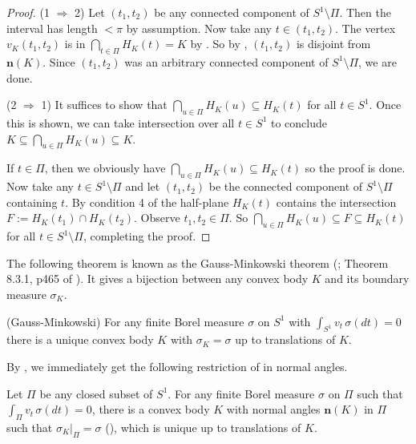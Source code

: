 \begin{proof}
(1 \(\Rightarrow\) 2) Let \((t_1, t_2)\) be any connected component of \(S^1 \setminus \Pi\). Then the interval has length \(< \pi\) by assumption. Now take any \(t \in (t_1, t_2)\). The vertex \(v_K(t_1, t_2)\) is in \(\bigcap_{t \in \Pi} H_K(t) = K\) by . So by , \((t_1, t_2)\) is disjoint from \(\mathbf{n}(K)\). Since \((t_1, t_2)\) was an arbitrary connected component of \(S^1 \setminus \Pi\), we are done.

(2 \(\Rightarrow\) 1) It suffices to show that \(\bigcap_{u \in \Pi} H_K(u) \subseteq H_K(t)\) for all \(t \in S^1\). Once this is shown, we can take intersection over all \(t \in S^1\) to conclude \(K \subseteq \bigcap_{u \in \Pi} H_K(u) \subseteq K\).

If \(t \in \Pi\), then we obviously have \(\bigcap_{u \in \Pi} H_K(u) \subseteq H_K(t)\) so the proof is done. Now take any \(t \in S^1 \setminus \Pi\) and let \((t_1, t_2)\) be the connected component of \(S^1 \setminus \Pi\) containing \(t\). By condition 4 of  the half-plane \(H_K(t)\) contains the intersection \(F := H_K(t_1) \cap H_K(t_2)\). Observe \(t_1, t_2 \in \Pi\). So \(\bigcap_{u \in \Pi} H_K(u) \subseteq F \subseteq H_K(t)\) for all \(t \in S^1 \setminus \Pi\), completing the proof.
\end{proof}

The following theorem is known as the Gauss-Minkowski theorem (\autocite{marckert2014compact}; Theorem 8.3.1, p465 of \cite{schneider_2013}). It gives a bijection between any convex body \(K\) and its boundary measure \(\sigma_K\).

\begin{theorem}

(Gauss-Minkowski) For any finite Borel measure \(\sigma\) on \(S^1\) with \(\int_{S^1} v_t \, \sigma (dt) = 0\) there is a unique convex body \(K\) with \(\sigma_K = \sigma\) up to translations of \(K\).

\label{thm:gauss-minkowski}
\end{theorem}

By , we immediately get the following restriction of  in normal angles.

\begin{corollary}

Let \(\Pi\) be any closed subset of \(S^1\). For any finite Borel measure \(\sigma\) on \(\Pi\) such that \(\int_{\Pi} v_t\,\sigma(dt) = 0\), there is a convex body \(K\) with normal angles \(\mathbf{n}(K)\) in \(\Pi\) such that \(\sigma_K|_{\Pi} = \sigma\) (), which is unique up to translations of \(K\).

\label{cor:supported-gauss-measure}
\end{corollary}